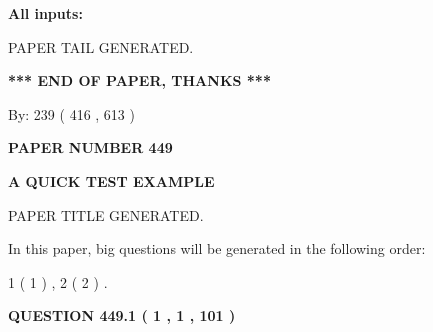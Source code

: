 \documentclass[12pt]{article}
\begin{document}
   
   
   
\noindent{}
   
   
   
   
\noindent\vspace{0.1in}\hspace{-0.08in} {\textbf{\Large{All inputs: }}}
   
   
   
   
   
   
 \vspace{0.2in}
 
   
   
\vspace{2.0in} PAPER TAIL GENERATED.
   
   
   
   
\vspace{1.0in} 
{\textbf{\large{ *** END OF PAPER, THANKS *** }}} 
   
   
\hspace{1.0in} By: 
 239 ( 416 ,  613 )
   
   
   
   
\newpage 
\setcounter{page}{ 
   449001 } 
   
   
   
   
 {\textbf{ \Large{ PAPER NUMBER  449  }}}
   
   
\vspace{0.2in}
   
   
   
   
   
   
   
   
 \vspace{0.2in}
{\LARGE {\textbf{ A QUICK TEST EXAMPLE}}}
   
   
 PAPER TITLE GENERATED.
   
   
   
\vspace{0.2in}
   
In this paper, big questions will be generated in the following order: 
   
   
   1 ( 1 )
 ,
   2 ( 2 )
 .
  
\vspace{0.2in}
  
{\textbf{\Large{QUESTION
449.1 
 ( 1 , 1 , 101 )
}}}
  
  
 
\end{document}
